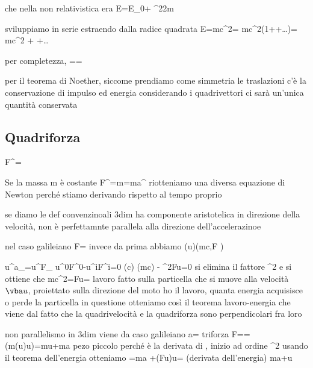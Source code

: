 che nella non relativistica era E=E_0+ ^2{2m}

sviluppiamo in serie estraendo dalla radice quadrata
	E=mc^2= mc^2\left(1++\dots \right)= mc^2 + +\dots 

per completezza, 
	==\beta 
	
per il teorema di Noether, siccome prendiamo come simmetria le traslazioni c'è la conservazione di impulso ed energia
considerando i quadrivettori ci sarà un'unica quantità conservata

\subsection{Quadriforza}
	F^\mu=
	
Se la massa m è costante
	F^\mu=m=ma^\mu
riotteniamo una diversa equazione di Newton perché stiamo derivando rispetto al tempo proprio

se diamo le def convenzinoali 3dim ha componente aristotelica in direzione della velocità, non è perfettamnte parallela alla direzione dell'accelerazinoe

nel caso galileiano \vba F=
invece da prima abbiamo 
	\gamma(u)\left(mc\dot\gamma,\vba F  \right)
	
	u^\mu a_=u^\mu F_\mu
	u^0F^0-u^iF^i=0
	(\gamma c) (\gamma mc\dot\gamma) - \gamma^2\vba F\vdot\vba u=0
si elimina il fattore \gamma^2 e si ottiene che
	mc^2\dot\gamma=\vba F\vdot\vba u=
lavoro fatto sulla particella che si muove alla velocità $\vba u$, proiettato sulla direzione del moto ho il lavoro, quanta energia acquisisce o perde la particella in questione
otteniamo così il teorema lavoro-energia che viene dal fatto che la quadrivelocità e la quadriforza sono perpendicolari fra loro 

non parallelismo in 3dim viene da
	caso galileiano \vba a=
	triforza \vba F==(m\gamma(u)\vba u)=m\dot\gamma\vba u+m\gamma\vba a
	pezo piccolo perché è la derivata di \gamma, inizio ad ordine \beta^2
	usando il teorema dell'energia otteniamo
	=m\gamma\vba a +(\vba F\vdot\vba u)\vba u= (derivata dell'energia) m\gamma\vba a+\vba u
	





